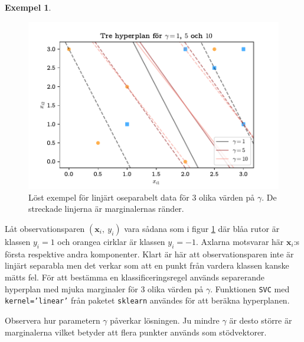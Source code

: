 \documentclass[a4paper, 12pt]{report}
\theoremstyle{definition}
\newtheorem{ex}{Exempel}[section]
\theoremstyle{remark}
\begin{document}
\begin{ex}
\begin{figure}[h]
	\centering
	\includegraphics[width=0.8\linewidth, trim={0.5cm 2mm 0.5cm 6mm}, clip]{KandFigur2.pdf}
	\caption{\label{fig:mjukamarginaler}Löst exempel för linjärt oseparabelt data för 3 olika värden på $\gamma$. De streckade linjerna är marginalernas ränder.}
\end{figure}
Låt observationsparen $\left(\mathbf{x}_i,~y_i\right)$ vara sådana som i figur \ref{fig:mjukamarginaler} där blåa rutor är klassen $y_i=1$ och orangea cirklar är klassen $y_i=-1$. Axlarna motsvarar här $\mathbf{x}_i$:s första respektive andra komponenter. Klart är här att observationsparen inte är linjärt separabla men det verkar som att en punkt från vardera klassen kanske mätts fel. För att bestämma en klassificeringsregel används separerande hyperplan med mjuka marginaler för 3 olika värden på $\gamma$. Funktionen \texttt{SVC} med \texttt{kernel='linear'} från paketet \texttt{sklearn} \cite{sklearn} användes för att beräkna hyperplanen.

Observera hur parametern $\gamma$ påverkar lösningen. Ju mindre $\gamma$ är desto större är marginalerna vilket betyder att flera punkter används som stödvektorer.
\end{ex}
\end{document}
